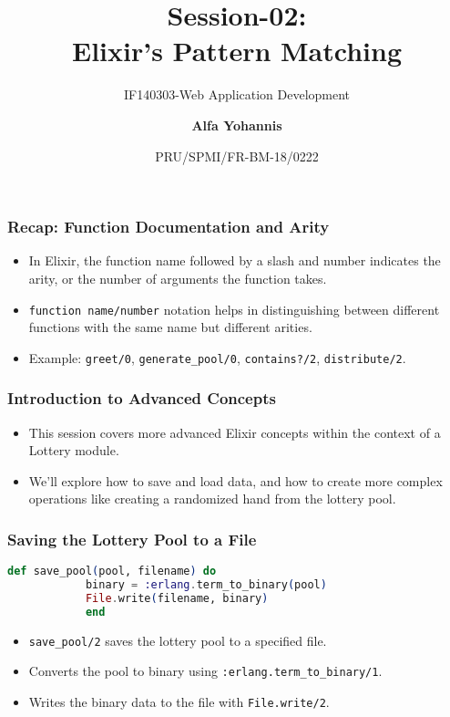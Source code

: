 \documentclass[aspectratio=169, table]{beamer}
\subtitle{IF140303-Web Application Development}
\title{\LARGE{Session-02:\\ Elixir's Pattern Matching}
	\vspace{15pt}}
\date[Serial]{\scriptsize {PRU/SPMI/FR-BM-18/0222}}
\author[Pradita]{\small{\textbf{Alfa Yohannis}}}
\begin{document}
	
	\frame{\titlepage}
	
	\begin{frame}
		\frametitle{Recap: Function Documentation and Arity}
		\begin{itemize}
			\item In Elixir, the function name followed by a slash and number indicates the arity, or the number of arguments the function takes.
			\item \texttt{function name/number} notation helps in distinguishing between different functions with the same name but different arities.
			\item Example: \texttt{greet/0}, \texttt{generate\_pool/0}, \texttt{contains?/2}, \texttt{distribute/2}.
		\end{itemize}
	\end{frame}
	
	\begin{frame}
		\frametitle{Introduction to Advanced Concepts}
		\begin{itemize}
			\item This session covers more advanced Elixir concepts within the context of a Lottery module.
			\item We’ll explore how to save and load data, and how to create more complex operations like creating a randomized hand from the lottery pool.
		\end{itemize}
	\end{frame}
	
	\begin{frame}[fragile]
		\frametitle{Saving the Lottery Pool to a File}
		\begin{lstlisting}[language=Elixir]
			def save_pool(pool, filename) do
			binary = :erlang.term_to_binary(pool)
			File.write(filename, binary)
			end
		\end{lstlisting}
		\begin{itemize}
			\item \texttt{save\_pool/2} saves the lottery pool to a specified file.
			\item Converts the pool to binary using \texttt{:erlang.term\_to\_binary/1}.
			\item Writes the binary data to the file with \texttt{File.write/2}.
		\end{itemize}
	\end{frame}
	
\end{document}

